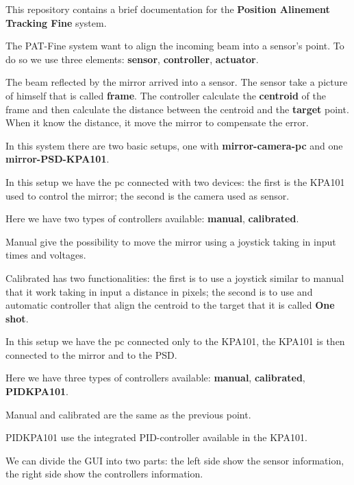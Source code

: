 This repository contains a brief documentation for the \textbf{Position
  Alinement Tracking Fine} system.


The PAT-Fine system want to align the incoming beam into a sensor's
point. To do so we use three elements: \textbf{sensor},
\textbf{controller}, \textbf{actuator}.


The beam reflected by the mirror arrived into a sensor. The sensor take
a picture of himself that is called \textbf{frame}. The controller
calculate the \textbf{centroid} of the frame and then calculate the
distance between the centroid and the \textbf{target} point. When it
know the distance, it move the mirror to compensate the error.

In this system there are two basic setups, one with
\textbf{mirror-camera-pc} and one \textbf{mirror-PSD-KPA101}.


In this setup we have the pc connected with two devices: the first is
the KPA101 used to control the mirror; the second is the camera used as
sensor.

Here we have two types of controllers available: \textbf{manual},
\textbf{calibrated}.

Manual give the possibility to move the mirror using a joystick taking
in input times and voltages.

Calibrated has two functionalities: the first is to use a joystick
similar to manual that it work taking in input a distance in pixels; the
second is to use and automatic controller that align the centroid to the
target that it is called \textbf{One shot}.


In this setup we have the pc connected only to the KPA101, the KPA101 is
then connected to the mirror and to the PSD.

Here we have three types of controllers available: \textbf{manual},
\textbf{calibrated}, \textbf{PIDKPA101}.

Manual and calibrated are the same as the previous point.

PIDKPA101 use the integrated PID-controller available in the KPA101.



We can divide the GUI into two parts: the left side show the sensor
information, the right side show the controllers information.

